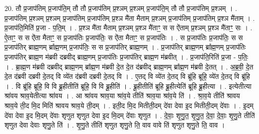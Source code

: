 \documentclass[17pt]{extarticle}
\begin{document}
20. तौ प्र॒जाप॑तिम् प्र॒जाप॑ति॒म् तौ तौ प्र॒जाप॑तिम् प्र॒श्ञम् प्र॒श्ञम् प्र॒जाप॑ति॒म् तौ तौ प्र॒जाप॑तिम् प्र॒श्ञम् । . प्र॒जाप॑तिम् प्र॒श्ञम् प्र॒श्ञम् प्र॒जाप॑तिम् प्र॒जाप॑तिम् प्र॒श्ञ मै॑ता मैताम् प्र॒श्ञम् प्र॒जाप॑तिम् प्र॒जाप॑तिम् प्र॒श्ञ मै॑ताम् । . प्र॒जाप॑ति॒मिति॑ प्र॒जा - प॒ति॒म् । . प्र॒श्ञ मै॑ता मैताम् प्र॒श्ञम् प्र॒श्ञ मै॑ताꣳ॒॒ स स ऐ॑ताम् प्र॒श्ञम् प्र॒श्ञ मै॑ताꣳ॒॒ सः । . ऐ॒ताꣳ॒॒ स स ऐ॑ता मैताꣳ॒॒ स प्र॒जाप॑तिः प्र॒जाप॑तिः॒ स ऐ॑ता मैताꣳ॒॒ स प्र॒जाप॑तिः । . स प्र॒जाप॑तिः प्र॒जाप॑तिः॒ स स प्र॒जाप॑तिर् ब्राह्म॒णम् ब्रा᳚ह्म॒णम् प्र॒जाप॑तिः॒ स स प्र॒जाप॑तिर् ब्राह्म॒णम् । . प्र॒जाप॑तिर् ब्राह्म॒णम् ब्रा᳚ह्म॒णम् प्र॒जाप॑तिः प्र॒जाप॑तिर् ब्राह्म॒ण म॑ब्रवी दब्रवीद् ब्राह्म॒णम् प्र॒जाप॑तिः प्र॒जाप॑तिर् ब्राह्म॒ण म॑ब्रवीत् । . प्र॒जाप॑ति॒रिति॑ प्र॒जा - प॒तिः॒ । . ब्रा॒ह्म॒ण म॑ब्रवी दब्रवीद् ब्राह्म॒णम् ब्रा᳚ह्म॒ण म॑ब्रवी दे॒त दे॒त द॑ब्रवीद् ब्राह्म॒णम् ब्रा᳚ह्म॒ण म॑ब्रवी दे॒तत् । . अ॒ब्र॒वी॒ दे॒त दे॒त द॑ब्रवी दब्रवी दे॒तद् वि व्ये॑त द॑ब्रवी दब्रवी दे॒तद् वि । . ए॒तद् वि व्ये॑त दे॒तद् वि ब्रू॑हि ब्रूहि॒ व्ये॑त दे॒तद् वि ब्रू॑हि । . वि ब्रू॑हि ब्रूहि॒ वि वि ब्रू॒हीतीति॑ ब्रूहि॒ वि वि ब्रू॒हीति॑ । . ब्रू॒हीतीति॑ ब्रूहि ब्रू॒हीत्येति॑ ब्रूहि ब्रू॒हीत्या । . इत्येतीत्या श्रा॑वय श्राव॒येतीत्या श्रा॑वय । . आ श्रा॑वय श्राव॒या श्रा॑व॒ये तीति॑ श्राव॒या श्रा॑व॒ये ति॑ । . श्रा॒व॒ये तीति॑ श्रावय श्राव॒ये ती॒द मि॒द मिति॑ श्रावय श्राव॒ये ती॒दम् । . इती॒द मि॒द मितीती॒दम् दे॑वा देवा इ॒द मितीती॒दम् दे॑वाः । . इ॒दम् दे॑वा देवा इ॒द मि॒दम् दे॑वाः शृणुत शृणुत देवा इ॒द मि॒दम् दे॑वाः शृणुत । . दे॒वाः॒ शृ॒णु॒त॒ शृ॒णु॒त॒ दे॒वा॒ दे॒वाः॒ शृ॒णु॒ते तीति॑ शृणुत देवा देवाः शृणु॒ते ति॑ । . शृ॒णु॒ते तीति॑ शृणुत शृणु॒ते ति॒ वाव वावे ति॑ शृणुत शृणु॒ते ति॒ वाव । \newline
\end{document}
